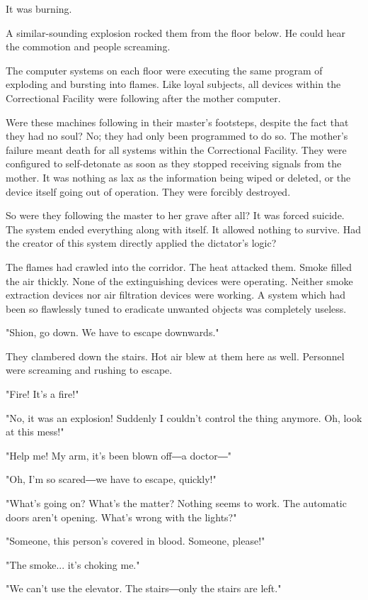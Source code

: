 It was burning.

A similar-sounding explosion rocked them from the floor below. He could
hear the commotion and people screaming.

The computer systems on each floor were executing the same program of
exploding and bursting into flames. Like loyal subjects, all devices
within the Correctional Facility were following after the mother
computer.

Were these machines following in their master's footsteps, despite the
fact that they had no soul? No; they had only been programmed to do so.
The mother's failure meant death for all systems within the Correctional
Facility. They were configured to self-detonate as soon as they stopped
receiving signals from the mother. It was nothing as lax as the
information being wiped or deleted, or the device itself going out of
operation. They were forcibly destroyed.

So were they following the master to her grave after all? It was forced
suicide. The system ended everything along with itself. It allowed
nothing to survive. Had the creator of this system directly applied the
dictator's logic?

The flames had crawled into the corridor. The heat attacked them. Smoke
filled the air thickly. None of the extinguishing devices were
operating. Neither smoke extraction devices nor air filtration devices
were working. A system which had been so flawlessly tuned to eradicate
unwanted objects was completely useless.

"Shion, go down. We have to escape downwards."

They clambered down the stairs. Hot air blew at them here as well.
Personnel were screaming and rushing to escape.

"Fire! It's a fire!"

"No, it was an explosion! Suddenly I couldn't control the thing anymore.
Oh, look at this mess!"

"Help me! My arm, it's been blown off―a doctor―"

"Oh, I'm so scared―we have to escape, quickly!"

"What's going on? What's the matter? Nothing seems to work. The
automatic doors aren't opening. What's wrong with the lights?"

"Someone, this person's covered in blood. Someone, please!"

"The smoke... it's choking me."

"We can't use the elevator. The stairs―only the stairs are left."

